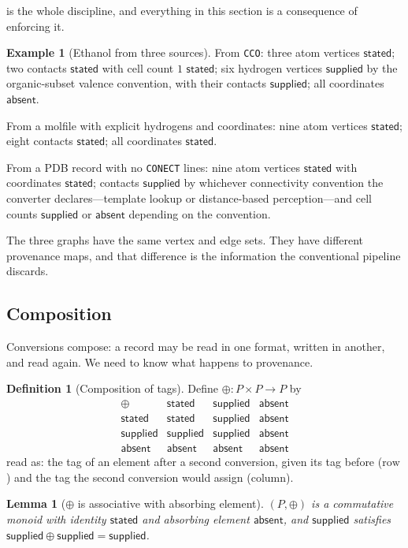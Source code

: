 \documentclass[11pt,twocolumn,a4paper]{article}
\theoremstyle{msthm}
\newtheorem{lemma}[theorem]{Lemma}
\theoremstyle{definition}
\newtheorem{definition}[theorem]{Definition}
\newtheorem{example}[theorem]{Example}
\theoremstyle{remark}
\newcommand{\ms}[1]{\texttt{#1}}
\newcommand{\stated}{\textsf{stated}}
\newcommand{\supplied}{\textsf{supplied}}
\newcommand{\absent}{\textsf{absent}}
\begin{document}
 is the whole discipline, and everything in this
section is a consequence of enforcing it.

\begin{example}[Ethanol from three sources]
\label{ex:ethanol}
From \ms{CCO}: three atom vertices $\stated$; two contacts $\stated$
with cell count $1$ $\stated$; six hydrogen vertices $\supplied$ by the
organic-subset valence convention, with their contacts $\supplied$; all
coordinates $\absent$.

From a molfile with explicit hydrogens and coordinates: nine atom
vertices $\stated$; eight contacts $\stated$; all coordinates $\stated$.

From a PDB record with no \ms{CONECT} lines: nine atom vertices
$\stated$ with coordinates $\stated$; contacts $\supplied$ by whichever
connectivity convention the converter declares---template lookup or
distance-based perception---and cell counts $\supplied$ or $\absent$
depending on the convention.

The three graphs have the same vertex and edge sets. They have
different provenance maps, and that difference is the information the
conventional pipeline discards.
\end{example}

\subsection{Composition}

Conversions compose: a record may be read in one format, written in
another, and read again. We need to know what happens to provenance.

\begin{definition}[Composition of tags]
\label{def:compose}
Define $\oplus\colon P\times P\to P$ by
\[
\begin{array}{c|ccc}
\oplus & \stated & \supplied & \absent\\\hline
\stated & \stated & \supplied & \absent\\
\supplied & \supplied & \supplied & \absent\\
\absent & \absent & \absent & \absent
\end{array}
\]
read as: the tag of an element after a second conversion, given its tag
before ($\text{row}$) and the tag the second conversion would assign
($\text{column}$).
\end{definition}

\begin{lemma}[$\oplus$ is associative with absorbing element]
\label{lem:monoid}
$(P,\oplus)$ is a commutative monoid with identity $\stated$ and
absorbing element $\absent$, and $\supplied$ satisfies
$\supplied\oplus\supplied=\supplied$.
\end{lemma}
\end{document}
